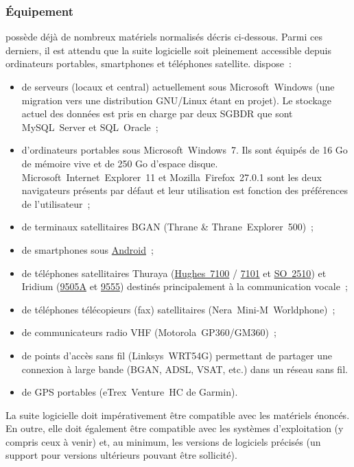 \subsubsection{Équipement}
\mo possède déjà de nombreux matériels normalisés décris ci-dessous. Parmi ces derniers, il est attendu que la suite logicielle soit pleinement accessible depuis ordinateurs portables, smartphones et téléphones satellite. \mo dispose~:
\begin{itemize}
	\item de serveurs (locaux et central) actuellement sous Microsoft~Windows (une migration vers une distribution GNU/Linux étant en projet). Le stockage actuel des données est pris en charge par deux SGBDR que sont MySQL~Server et SQL~Oracle~;
	\item d'ordinateurs portables sous Microsoft~Windows~7. Ils sont équipés de 16 Go de mémoire vive et de 250 Go d'espace disque. Microsoft~Internet~Explorer~11 et Mozilla~Firefox~27.0.1 sont les deux navigateurs présents par défaut et leur utilisation est fonction des préférences de l'utilisateur~;
	\item de terminaux satellitaires BGAN (Thrane \& Thrane~Explorer~500)~;
	\item de smartphones sous \href{http://www.android.com/}{Android}~;
	\item de téléphones satellitaires Thuraya (\href{http://www.thuraya.com.kw/hughes7101.html}{Hughes~7100} / \href{http://www.thuraya.com.kw/hughes7100.html}{7101} et \href{http://www.thuraya.com.kw/so-2510.html}{SO~2510}) et Iridium (\href{http://www.iridium.com/products/Iridium-9505A-Satellite-Phone.aspx}{9505A} et \href{http://www.iridium.com/products/Iridium9555SatellitePhone.aspx}{9555}) destinés principalement à la communication vocale~;
	\item de téléphones télécopieurs (fax) satellitaires (Nera~Mini-M~Worldphone)~;
	\item de communicateurs radio VHF (Motorola~GP360/GM360)~;
	\item de points d'accès sans fil (Linksys~WRT54G) permettant de partager une connexion à large bande (BGAN, ADSL, VSAT, etc.) dans un réseau sans fil.
	\item de GPS portables (eTrex~Venture~HC de Garmin).
\end{itemize}
\begin{constraint}
La suite logicielle doit impérativement être compatible avec les matériels énoncés. En outre, elle doit également être compatible avec les systèmes d'exploitation (y compris ceux à venir) et, au minimum, les versions de logiciels précisés (un support pour versions ultérieurs pouvant être sollicité).
\end{constraint}

